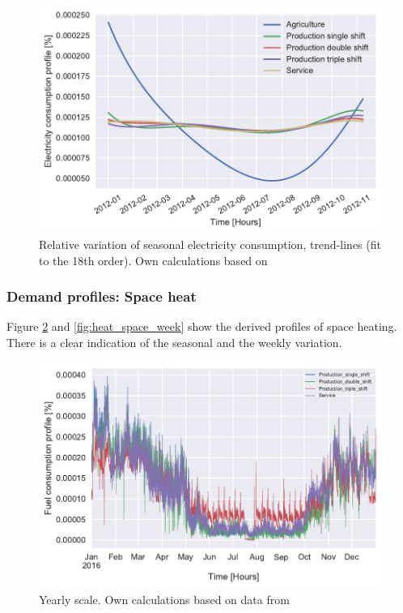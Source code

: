\documentclass[review]{elsarticle}
\begin{document}
\begin{figure}[H]
\centering
\includegraphics[width=\linewidth]{Img/profiles/trendlines.pdf}
\caption{Relative variation of seasonal electricity consumption, trend-lines (fit to the 18th order). Own calculations based on \cite{Energinet.dk,NordPool2016,ElforbrugsPanelerne2015,Andersen2013a,Andersen2013b,VM2015}}
\label{fig:trendlines}
\end{figure}

\subsubsection{Demand profiles: Space heat}
Figure \ref{fig:heat_space_year} and \ref{fig:heat_space_week} show the derived profiles of space heating. There is a clear indication of the seasonal and the weekly variation.

\begin{figure}[H]
\centering
\includegraphics[width=\linewidth]{Img/profiles/heatprofile_space_year_perc.pdf}
\caption{Yearly scale. Own calculations based on data from \cite{DanskGasDistribution2016,VM2015}}
\label{fig:heat_space_year}
\end{figure}
	
\end{document}
